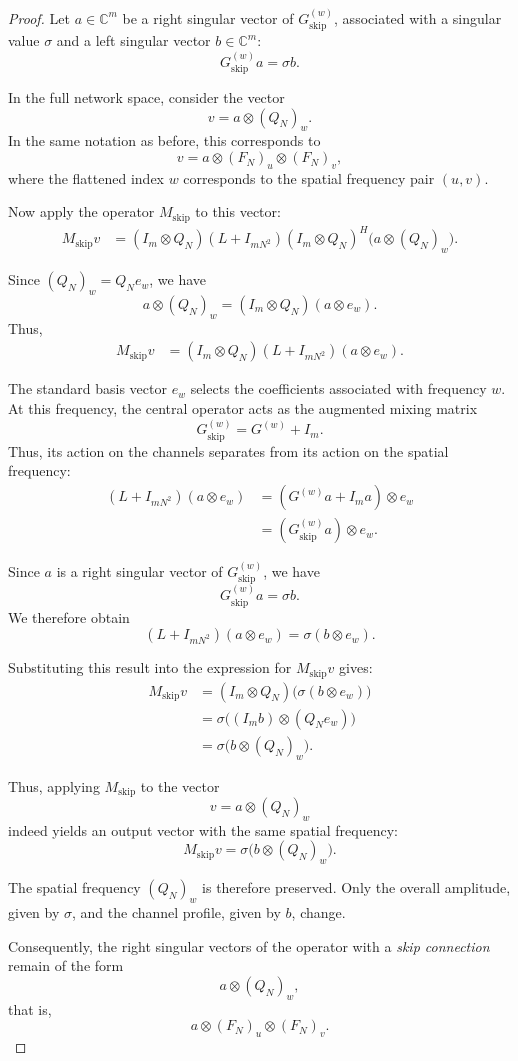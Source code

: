 \begin{proof}

Let $a \in \mathbb{C}^m$ be a right singular vector of $G_{\mathrm{skip}}^{(w)}$, associated with a singular value $\sigma$ and a left singular vector $b \in \mathbb{C}^m$:
\[
G_{\mathrm{skip}}^{(w)}a = \sigma b.
\]

In the full network space, consider the vector
\[
v = a \otimes (Q_N)_w.
\]
In the same notation as before, this corresponds to
\[
v = a \otimes (F_N)_u \otimes (F_N)_v,
\]
where the flattened index $w$ corresponds to the spatial frequency pair $(u,v)$.

Now apply the operator $M_{\mathrm{skip}}$ to this vector:
\begin{align*}
M_{\mathrm{skip}}v
&=
(I_m \otimes Q_N)(L + I_{mN^2})(I_m \otimes Q_N)^H
\bigl(a \otimes (Q_N)_w\bigr).
\end{align*}

Since $(Q_N)_w = Q_N e_w$, we have
\[
a \otimes (Q_N)_w
=
(I_m \otimes Q_N)(a \otimes e_w).
\]
Thus,
\begin{align*}
M_{\mathrm{skip}}v
&=
(I_m \otimes Q_N)(L + I_{mN^2})(a \otimes e_w).
\end{align*}

The standard basis vector $e_w$ selects the coefficients associated with frequency $w$.
At this frequency, the central operator acts as the augmented mixing matrix
\[
G_{\mathrm{skip}}^{(w)} = G^{(w)} + I_m.
\]
Thus, its action on the channels separates from its action on the spatial frequency:
\begin{align*}
(L + I_{mN^2})(a \otimes e_w)
&= (G^{(w)}a + I_m a) \otimes e_w \\
&= (G_{\mathrm{skip}}^{(w)}a) \otimes e_w.
\end{align*}

Since $a$ is a right singular vector of $G_{\mathrm{skip}}^{(w)}$, we have
\[
G_{\mathrm{skip}}^{(w)}a = \sigma b.
\]
We therefore obtain
\[
(L + I_{mN^2})(a \otimes e_w) = \sigma(b \otimes e_w).
\]

Substituting this result into the expression for $M_{\mathrm{skip}}v$ gives:
\begin{align*}
M_{\mathrm{skip}}v
&=
(I_m \otimes Q_N) \bigl( \sigma(b \otimes e_w) \bigr) \\
&= \sigma \bigl( (I_m b) \otimes (Q_N e_w) \bigr) \\
&= \sigma\bigl(b \otimes (Q_N)_w\bigr).
\end{align*}

Thus, applying $M_{\mathrm{skip}}$ to the vector
\[
v = a \otimes (Q_N)_w
\]
indeed yields an output vector with the same spatial frequency:
\[
M_{\mathrm{skip}}v = \sigma\bigl(b \otimes (Q_N)_w\bigr).
\]

The spatial frequency $(Q_N)_w$ is therefore preserved. Only the overall amplitude, given by $\sigma$, and the channel profile, given by $b$, change.

Consequently, the right singular vectors of the operator with a \textit{skip connection} remain of the form
\[
a \otimes (Q_N)_w,
\]
that is,
\[
a \otimes (F_N)_u \otimes (F_N)_v.
\]
\end{proof}

